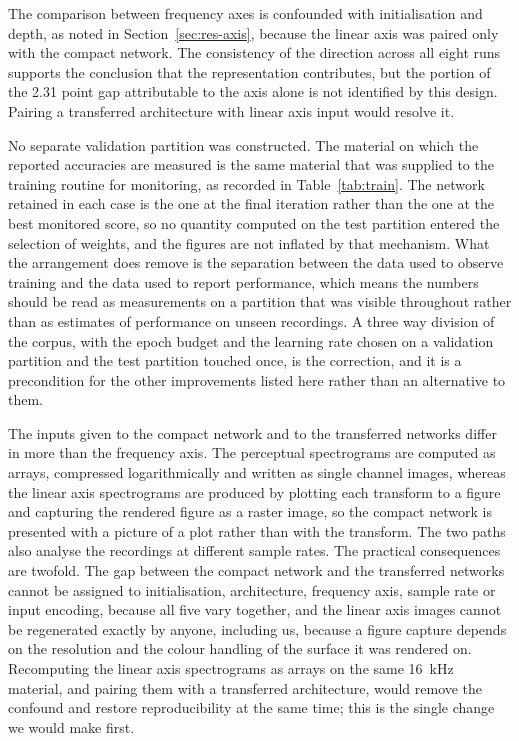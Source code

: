 \documentclass[pdflatex,sn-mathphys-num]{sn-jnl}
\begin{document}
The comparison between frequency axes is confounded with initialisation and
depth, as noted in Section~\ref{sec:res-axis}, because the linear axis was
paired only with the compact network. The consistency of the direction across
all eight runs supports the conclusion that the representation contributes,
but the portion of the 2.31 point gap attributable to the axis alone is not
identified by this design. Pairing a transferred architecture with linear axis
input would resolve it.

No separate validation partition was constructed. The material on which the
reported accuracies are measured is the same material that was supplied to the
training routine for monitoring, as recorded in Table~\ref{tab:train}. The
network retained in each case is the one at the final iteration rather than
the one at the best monitored score, so no quantity computed on the test
partition entered the selection of weights, and the figures are not inflated
by that mechanism. What the arrangement does remove is the separation between
the data used to observe training and the data used to report performance,
which means the numbers should be read as measurements on a partition that was
visible throughout rather than as estimates of performance on unseen
recordings. A three way division of the corpus, with the epoch budget and the
learning rate chosen on a validation partition and the test partition touched
once, is the correction, and it is a precondition for the other improvements
listed here rather than an alternative to them.

The inputs given to the compact network and to the transferred networks differ
in more than the frequency axis. The perceptual spectrograms are computed as
arrays, compressed logarithmically and written as single channel images,
whereas the linear axis spectrograms are produced by plotting each transform
to a figure and capturing the rendered figure as a raster image, so the
compact network is presented with a picture of a plot rather than with the
transform. The two paths also analyse the recordings at different sample
rates. The practical consequences are twofold. The gap between the compact
network and the transferred networks cannot be assigned to initialisation,
architecture, frequency axis, sample rate or input encoding, because all five
vary together, and the linear axis images cannot be regenerated exactly by
anyone, including us, because a figure capture depends on the resolution and
the colour handling of the surface it was rendered on. Recomputing the linear
axis spectrograms as arrays on the same 16~kHz material, and pairing them with
a transferred architecture, would remove the confound and restore
reproducibility at the same time; this is the single change we would make
first.
\end{document}
